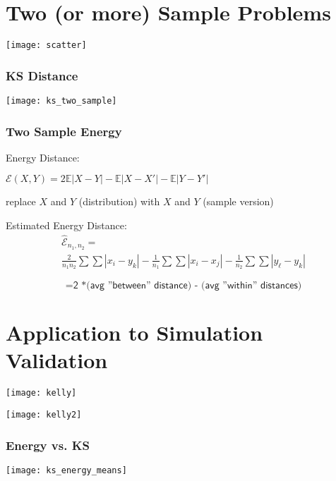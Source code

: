 \documentclass[presentation]{beamer}
\begin{document}
\section{Two (or more) Sample Problems}

\begin{frame}
\texttt{[image: scatter]}
\end{frame}

\begin{frame}
  \frametitle{KS Distance}
  \texttt{[image: ks\_two\_sample]}
\end{frame}

\begin{frame}
  \frametitle{Two Sample Energy}
  \begin{block}{Energy Distance:}
    \begin{center}
      $\mathcal{E}(X,Y) = 2\mathbb{E}|X - Y| - \mathbb{E}|X - X'| -
      \mathbb{E}|Y - Y'|$
    \end{center}
  \end{block}
  replace $X$ and $Y$ (distribution) with $X$ and $Y$ (sample version)
  \begin{block}{Estimated Energy Distance:}
    \begin{gather*}
      \hat{\mathcal{E}}_{n_1, n_2} = \\ \frac{2}{n_1 n_2} \sum \sum |x_i - y_k| -
      \frac{1}{n_1} \sum \sum |x_i - x_j| - \frac{1}{n_2} \sum \sum |y_\ell - y_k| 
    \end{gather*}

    \begin{displaymath}
      = \textsf{2 *(avg ''between'' distance) - (avg ''within'' distances)}
    \end{displaymath}
  \end{block}
\end{frame}

\section{Application to Simulation Validation}

\begin{frame}
  \texttt{[image: kelly]}
\end{frame}

\begin{frame}
  \texttt{[image: kelly2]}
\end{frame}

\begin{frame}
  \frametitle{Energy vs. KS}
 \texttt{[image: ks\_energy\_means]} 
\end{frame}
\end{document}
